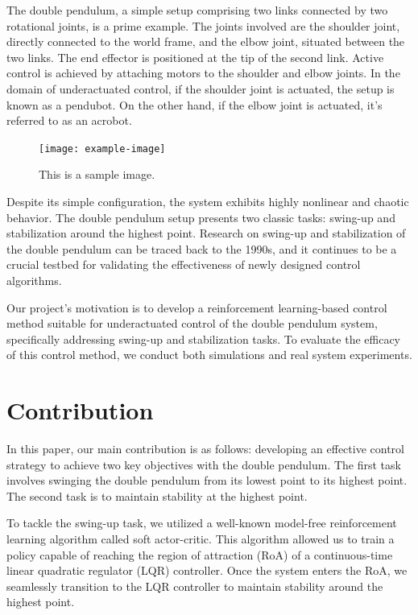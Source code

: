 The double pendulum, a simple setup comprising two links connected by two rotational joints, is a prime example. The joints involved are the shoulder joint, directly connected to the world frame, and the elbow joint, situated between the two links. The end effector is positioned at the tip of the second link. Active control is achieved by attaching motors to the shoulder and elbow joints. In the domain of underactuated control, if the shoulder joint is actuated, the setup is known as a pendubot. On the other hand, if the elbow joint is actuated, it's referred to as an acrobot.

\begin{figure}[h]
  \centering
  \texttt{[image: example-image]} %
  \caption{This is a sample image.}
  \label{fig:sample}
\end{figure}

Despite its simple configuration, the system exhibits highly nonlinear and chaotic behavior. The double pendulum setup presents two classic tasks: swing-up and stabilization around the highest point. Research on swing-up and stabilization of the double pendulum can be traced back to the 1990s, and it continues to be a crucial testbed for validating the effectiveness of newly designed control algorithms.

Our project's motivation is to develop a reinforcement learning-based control method suitable for underactuated control of the double pendulum system, specifically addressing swing-up and stabilization tasks. To evaluate the efficacy of this control method, we conduct both simulations and real system experiments.


\section{Contribution}
In this paper, our main contribution is as follows: developing an effective control strategy to achieve two key objectives with the double pendulum. The first task involves swinging the double pendulum from its lowest point to its highest point. The second task is to maintain stability at the highest point. 

To tackle the swing-up task, we utilized a well-known model-free reinforcement learning algorithm called soft actor-critic. This algorithm allowed us to train a policy capable of reaching the region of attraction (RoA) of a continuous-time linear quadratic regulator (LQR) controller. Once the system enters the RoA, we seamlessly transition to the LQR controller to maintain stability around the highest point.

